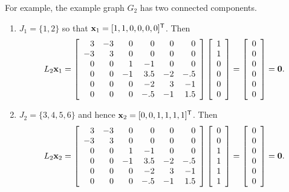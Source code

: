 For example, the example graph $G_2$ has two connected components.
\begin{enumerate}
\item $J_1 = \{1,2\}$ so that $\mathbf{x}_1 = [1, 1, 0, 0, 0, 0]^{\mathsf T}$.
Then
\[
L_2\mathbf{x}_1 =
\left[\begin{array}{rrrrrr}
3 & -3 & 0 & 0 & 0 & 0\\
-3 & 3 & 0 & 0 & 0 & 0\\
0 & 0 & 1 & -1 & 0 & 0\\
0 & 0 & -1 & 3.5 & -2 & -.5\\
0 & 0 & 0 & -2 & 3 & -1\\
0 & 0 & 0 &- .5 & -1 & 1.5
\end{array}\right]
\left[\begin{array}{c}
1 \\ 1 \\ 0 \\ 0 \\ 0 \\ 0
\end{array}\right]
=
\left[\begin{array}{c}
0 \\ 0 \\ 0 \\ 0 \\ 0 \\ 0
\end{array}\right]
= \mathbf{0}.
\]

\item $J_2 = \{3,4,5,6\}$ and hence $\mathbf{x}_2 = [0, 0, 1, 1, 1, 1]^{\mathsf T}$.
Then
\[
L_2\mathbf{x}_2 =
\left[\begin{array}{rrrrrr}
3 & -3 & 0 & 0 & 0 & 0\\
-3 & 3 & 0 & 0 & 0 & 0\\
0 & 0 & 1 & -1 & 0 & 0\\
0 & 0 & -1 & 3.5 & -2 & -.5\\
0 & 0 & 0 & -2 & 3 & -1\\
0 & 0 & 0 &- .5 & -1 & 1.5
\end{array}\right]
\left[\begin{array}{c}
0 \\ 0 \\ 1 \\ 1 \\ 1 \\ 1
\end{array}\right]
=
\left[\begin{array}{c}
0 \\ 0 \\ 0 \\ 0 \\ 0 \\ 0
\end{array}\right]
= \mathbf{0}.
\]
\end{enumerate}

